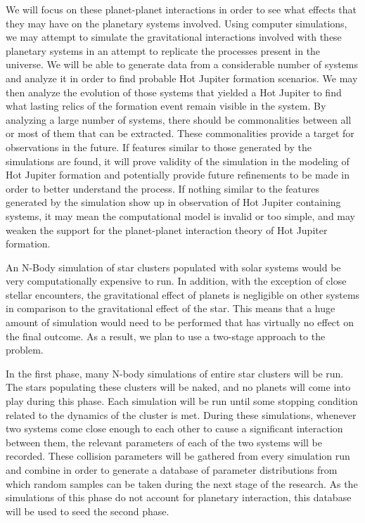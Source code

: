 \documentclass[12pt]{article}
\begin{document}
We will focus on these planet-planet interactions in order to see what effects that 
they may have on the planetary systems involved. Using computer simulations, we
may attempt to simulate the gravitational interactions involved with these planetary
systems in an attempt to replicate the processes present in the universe. We will
be able to generate data from a considerable number of systems and analyze it
in order to find probable Hot Jupiter formation scenarios. We may then
analyze the evolution of those systems that yielded a Hot Jupiter to find
what lasting relics of the formation event remain visible in the system.
By analyzing a large number of systems, there should be commonalities between
all or most of them that can be extracted. These commonalities provide a target
for observations in the future. If features similar to those generated by the
simulations are found, it will prove validity of the simulation in the modeling of Hot Jupiter
formation and potentially provide future refinements to be made in order to better understand
the process. If nothing similar
to the features generated by the simulation show up in observation of Hot Jupiter containing
systems, it may mean the computational model is invalid or too simple, and may
weaken the support for the planet-planet interaction theory of Hot Jupiter formation.

An N-Body simulation of star clusters populated with solar systems would be very
computationally expensive to run. In addition, with the exception of close
stellar encounters, the gravitational effect of planets is negligible on other
systems in comparison to the gravitational effect of the star. This means that
a huge amount of simulation would need to be performed that has virtually no
effect on the final outcome. As a result, we plan to use a two-stage approach to
the problem.

In the first phase, many N-body simulations of entire star clusters will be run. 
The stars populating these clusters will be naked, and no planets will come into
play during this phase.  Each simulation will be run until some stopping condition 
related to the dynamics of the
cluster is met. During these simulations, whenever two systems come close enough
to each other to cause a significant interaction between them, the relevant
parameters of each of the two systems will be recorded. These collision parameters
will be gathered from every simulation run and combine in order to generate
a database of parameter distributions from which random samples can be taken during
the next stage of the research. As the simulations of this phase do not 
account for planetary interaction, this database will be used to seed the second phase.
\end{document}
